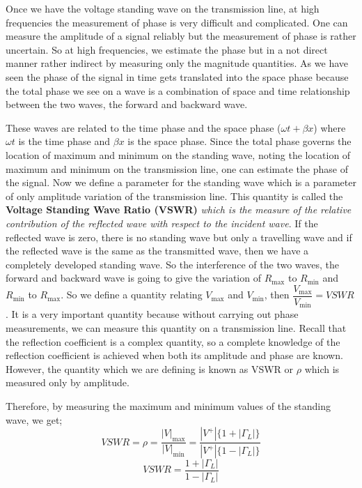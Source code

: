 Once we have the voltage standing wave on the transmission line, at high frequencies the measurement of phase is very difficult and complicated. One can measure the amplitude of a signal reliably but the measurement of phase is rather uncertain. So at high frequencies, we estimate the phase but in a not direct manner rather indirect by measuring only the magnitude quantities. As we have seen the phase of the signal in time gets translated into the space phase because the total phase we see on a wave is a combination of space and time relationship between the two waves, the forward and backward wave. 

These waves are related to the time phase and the space phase ($\omega t + \beta x$) where $\omega t$ is the time phase and $\beta x$ is the space phase. Since the total phase governs the location of maximum and minimum on the standing wave, noting the location of maximum and minimum on the transmission line, one can estimate the phase of the signal. Now we define a parameter for the standing wave which is a parameter of only amplitude variation of the transmission line. This quantity is called the \textbf{Voltage Standing Wave Ratio (VSWR)} \emph{which is the measure of the relative contribution of the reflected wave with respect to the incident wave}. If the reflected wave is zero, there is no standing wave but only a travelling wave and if the reflected wave is the same as the transmitted wave, then we have a completely developed standing wave. So the interference of the two waves, the forward and backward wave is going to give the variation of $R_{\max}$ to $R_{\min}$ and $R_{\min}$ to $R_{\max}$. So we define a quantity relating $V_{\max}$ and $V_{\min}$, then $\dfrac{V_{\max}}{V_{\min}}= VSWR$. It is a very important quantity because without carrying out phase measurements, we can measure this quantity on a transmission line. Recall that the reflection coefficient is a complex quantity, so a complete knowledge of the reflection coefficient is achieved when both its amplitude and phase are known. However, the quantity which we are defining is known as VSWR or \(\rho\) which is measured only by amplitude.

Therefore, by measuring the maximum and minimum values of the standing wave, we get;
\begin{dmath*}
VSWR = \rho =\frac{|V|_{\max}}{|V|_{\min}} = \frac{|V^+|\{1+|\Gamma_L|\}}{|V^+|\{1-|\Gamma_L|\}}
\end{dmath*}
\begin{equation}
VSWR  = \frac{1+|\Gamma_L|}{1-|\Gamma_L|}
\label{eqn:vswr}	
\end{equation}

